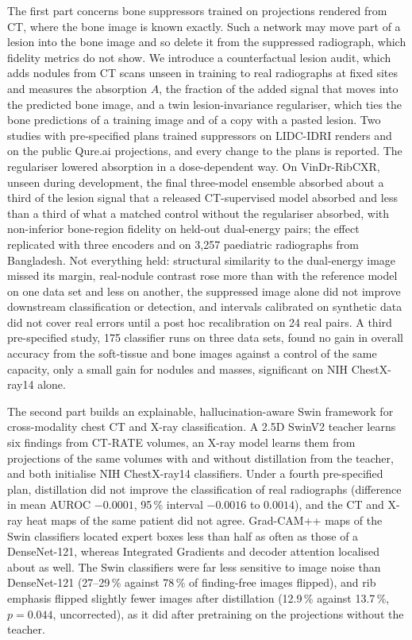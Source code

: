 \documentclass[11pt,a4paper,openany]{report}
\begin{document}
The first part concerns bone suppressors trained on projections rendered from CT, where the bone image is known exactly. Such a network may
move part of a lesion into the bone image and so delete it from the suppressed radiograph, which fidelity metrics do not show. We introduce
a counterfactual lesion audit, which adds nodules from CT scans unseen in training to real radiographs at fixed sites and
measures the absorption $A$, the fraction of the added signal that moves into the predicted bone image, and a twin lesion-invariance
regulariser, which ties the bone predictions of a training image and of a copy with a pasted lesion. Two studies with pre-specified plans
trained suppressors on LIDC-IDRI renders and on the public Qure.ai projections, and every change to the plans is reported. The regulariser
lowered absorption in a dose-dependent way. On VinDr-RibCXR, unseen during development, the final three-model ensemble
absorbed about a third of the lesion signal that a released CT-supervised model absorbed and less than a third of what a matched control
without the regulariser absorbed, with non-inferior bone-region fidelity on held-out dual-energy pairs; the effect replicated with three
encoders and on 3,257 paediatric radiographs from Bangladesh. Not everything held: structural similarity to the dual-energy image missed its
margin, real-nodule contrast rose more than with the reference model on one data set and less on another, the suppressed image alone did
not improve downstream classification or detection, and intervals calibrated on synthetic data did not cover real errors until a post hoc
recalibration on 24 real pairs. A third pre-specified study, 175 classifier runs on three data sets, found no gain in overall accuracy from
the soft-tissue and bone images against a control of the same capacity, only a small gain for nodules and masses, significant on NIH
ChestX-ray14 alone.

The second part builds an explainable, hallucination-aware Swin framework for cross-modality chest CT and X-ray classification. A 2.5D
SwinV2 teacher learns six findings from CT-RATE volumes, an X-ray model learns them from projections of the same volumes with and without
distillation from the teacher, and both initialise NIH ChestX-ray14 classifiers. Under a fourth pre-specified plan, distillation did not
improve the classification of real radiographs (difference in mean AUROC $-0.0001$, 95\,\% interval $-0.0016$ to $0.0014$), and the CT and
X-ray heat maps of the same patient did not agree. Grad-CAM++ maps of the Swin classifiers located expert boxes less than half as often as
those of a DenseNet-121, whereas Integrated Gradients and decoder attention localised about as well. The Swin classifiers were far less
sensitive to image noise than DenseNet-121 (27--29\,\% against 78\,\% of finding-free images flipped), and rib emphasis
flipped slightly fewer images after distillation (12.9\,\% against 13.7\,\%, $p=0.044$, uncorrected), as it did after pretraining on the
projections without the teacher.
\end{document}
